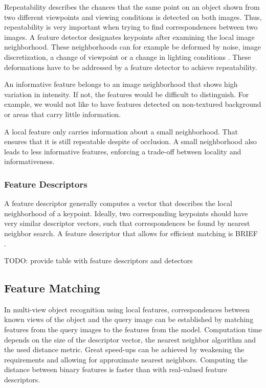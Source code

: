 Repeatability describes the chances that the same point on an object shown from
two different viewpoints and viewing conditions is detected on both images.
Thus, repeatability is very important when trying to find correspondences
between two images. A feature detector designates keypoints after examining the
local image neighborhood. These neighborhoods can for example be deformed by
noise, image discretization, a change of viewpoint or a change in lighting
conditions \cite{Tuytelaars2007}. These deformations have to be addressed by a
feature detector to achieve repeatability.

An informative feature belongs to an image neighborhood that shows high
variation in intensity. If not, the features would be difficult to distinguish.
For example, we would not like to have features detected on non-textured
background or areas that carry little information.

A local feature only carries information about a small neighborhood. That
ensures that it is still repeatable despite of occlusion. A small neighborhood
also leads to less informative features, enforcing a trade-off between locality
and informativeness.


\subsubsection{Feature Descriptors}

A feature descriptor generally computes a vector that describes the local
neighborhood of a keypoint. Ideally, two corresponding keypoints should have
very similar descriptor vectors, such that correspondences be found by
nearest neighbor search. A feature descriptor that allows for efficient
matching is BRIEF \cite{Calonder2010}.

TODO: provide table with feature descriptors and detectors

\subsection{Feature Matching}

In multi-view object recognition using local features, correspondences between
known views of the object and the query image can be established by matching
features from the query images to the features from the model. Computation time
depends on the size of the descriptor vector, the nearest neighbor algorithm
and the used distance metric. Great speed-ups can be achieved by weakening the
requirements and allowing for approximate nearest neighbors. Computing the
distance between binary features is faster than with real-valued feature
descriptors.

